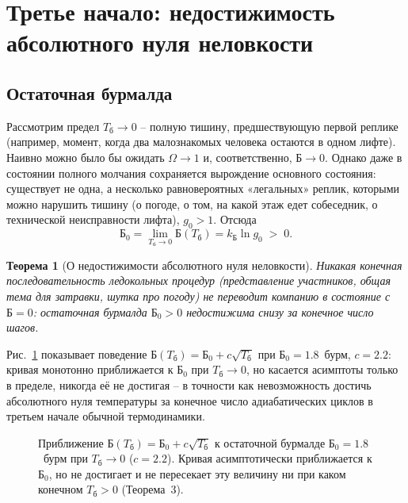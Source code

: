 \documentclass[11pt,a4paper]{article}
\newtheorem{theorem}{Теорема}
\newcommand{\Burm}{\text{Б}}
\newcommand{\kB}{k_{\text{Б}}}
\newcommand{\Tb}{T_{\text{б}}}
\begin{document}
\section{Третье начало: недостижимость абсолютного нуля неловкости}

\subsection{Остаточная бурмалда}

Рассмотрим предел $\Tb\to0$ -- полную тишину, предшествующую первой реплике (например, момент, когда два малознакомых человека остаются в одном лифте). Наивно можно было бы ожидать $\Omega\to1$ и, соответственно, $\Burm\to0$. Однако даже в состоянии полного молчания сохраняется вырождение основного состояния: существует не одна, а несколько равновероятных «легальных» реплик, которыми можно нарушить тишину (о погоде, о том, на какой этаж едет собеседник, о технической неисправности лифта), $g_0>1$. Отсюда
\[
\Burm_0 = \lim_{\Tb\to0}\Burm(\Tb) = \kB \ln g_0 \;>\; 0.
\]

\begin{theorem}[О недостижимости абсолютного нуля неловкости]
Никакая конечная последовательность ледокольных процедур (представление участников, общая тема для затравки, шутка про погоду) не переводит компанию в состояние с $\Burm=0$: остаточная бурмалда $\Burm_0>0$ недостижима снизу за конечное число шагов.
\end{theorem}

Рис.~\ref{fig:third-law} показывает поведение $\Burm(\Tb)=\Burm_0+c\sqrt{\Tb}$ при $\Burm_0=1.8$~бурм, $c=2.2$: кривая монотонно приближается к $\Burm_0$ при $\Tb\to0$, но касается асимптоты только в пределе, никогда её не достигая -- в точности как невозможность достичь абсолютного нуля температуры за конечное число адиабатических циклов в третьем начале обычной термодинамики.

\begin{figure}[htbp]
\centering
{}
\caption{Приближение $\Burm(\Tb)=\Burm_0+c\sqrt{\Tb}$ к остаточной бурмалде $\Burm_0=1.8$~бурм при $\Tb\to0$ ($c=2.2$). Кривая асимптотически приближается к $\Burm_0$, но не достигает и не пересекает эту величину ни при каком конечном $\Tb>0$ (Теорема~3).}
\label{fig:third-law}
\end{figure}
\end{document}
